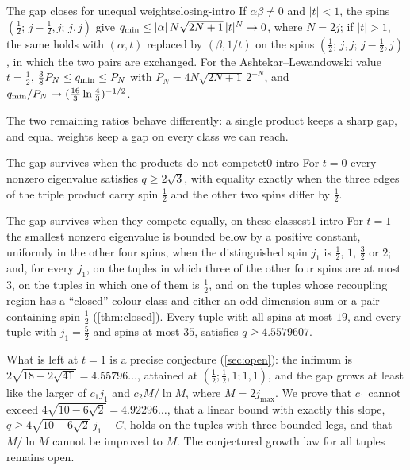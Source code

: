 \begin{theorem}{The gap closes for unequal weights}{closing-intro}
If $\alpha\beta\ne0$ and $|t|<1$, the spins $(\frac12;\,j-\frac12,j;\,j,j)$ give
$q_{\min}\le|\alpha|\,N\sqrt{2N+1}\,|t|^N\to0$, where $N=2j$; if $|t|>1$, the same holds
with $(\alpha,t)$ replaced by $(\beta,1/t)$ on the spins $(\frac12;\,j,j;\,j-\frac12,j)$,
in which the two pairs are exchanged. For the
Ashtekar--Lewandowski value $t=\frac12$, $\frac38P_N\le q_{\min}\le P_N$ with
$P_N=4N\sqrt{2N+1}\,2^{-N}$, and $q_{\min}/P_N\to(\frac{16}3\ln\frac43)^{-1/2}$.
\end{theorem}

The two remaining ratios behave differently: a single product keeps a sharp gap, and
equal weights keep a gap on every class we can reach.

\begin{theorem}{The gap survives when the products do not compete}{t0-intro}
For $t=0$ every nonzero eigenvalue satisfies $q\ge2\sqrt3$, with equality exactly
when the three edges of the triple product carry spin $\frac12$ and the other two
spins differ by $\frac12$.
\end{theorem}

\begin{theorem}{The gap survives when they compete equally, on these classes}{t1-intro}
For $t=1$ the smallest nonzero eigenvalue is bounded below by a positive constant,
uniformly in the other four spins, when the distinguished spin $j_1$ is $\frac12$,
$1$, $\frac32$\zmark{} or $2$; and, for every $j_1$, on the tuples in which three
of the other four spins are at most $3$, on the tuples in which one of them is
$\frac12$, and on the tuples whose recoupling region has a ``closed'' colour class and
either an odd dimension sum or a pair containing spin $\frac12$ (\cref{thm:closed}). Every tuple with all spins at most $19$, and every tuple with
$j_1=\frac52$ and spins at most $35$, satisfies $q\ge4.5579607$.
\end{theorem}

What is left at $t=1$ is a precise conjecture (\cref{sec:open}): the infimum is
$2\sqrt{18-2\sqrt{41}}=4.55796\ldots$, attained at $(\frac12;\frac12,1;1,1)$, and the
gap grows at least like the larger of $c_1j_1$ and $c_2M/\ln M$, where $M=2j_{\max}$.
We prove that $c_1$ cannot exceed $4\sqrt{10-6\sqrt2}=4.92296\ldots$, that a linear
bound with exactly this slope, $q\ge4\sqrt{10-6\sqrt2}\,j_1-C$, holds on the tuples with
three bounded legs, and that $M/\ln M$ cannot be improved to $M$. The
conjectured growth law for all tuples remains open.

